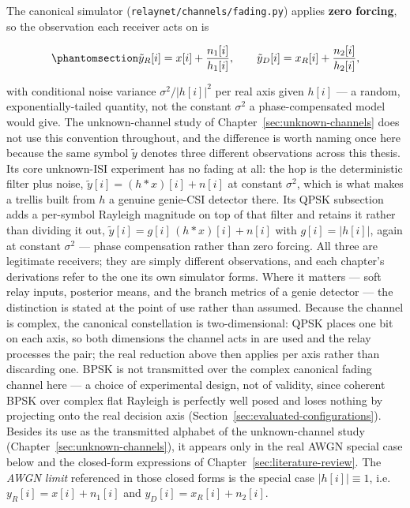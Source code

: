 The canonical simulator (\texttt{relaynet/channels/fading.py}) applies \textbf{zero forcing}, so the observation each receiver acts on is

\begin{equation}\protect\phantomsection\label{eq:awgn-hop1}{\tilde{y}_R[i] = x[i] + \frac{n_1[i]}{h_1[i]}, \qquad \tilde{y}_D[i] = x_R[i] + \frac{n_2[i]}{h_2[i]},
}\end{equation}

with conditional noise variance $\sigma^{2}/|h[i]|^{2}$ per real axis given $h[i]$ --- a random, exponentially-tailed quantity, not the constant $\sigma^{2}$ a phase-compensated model would give. The unknown-channel study of Chapter~\ref{sec:unknown-channels} does not use this convention throughout, and the difference is worth naming once here because the same symbol $\tilde{y}$ denotes three different observations across this thesis. Its core unknown-ISI experiment has no fading at all: the hop is the deterministic filter plus noise, $\tilde{y}[i] = (h \ast x)[i] + n[i]$ at constant $\sigma^{2}$, which is what makes a trellis built from $h$ a genuine genie-CSI detector there. Its QPSK subsection adds a per-symbol Rayleigh magnitude on top of that filter and retains it rather than dividing it out, $\tilde{y}[i] = g[i]\,(h \ast x)[i] + n[i]$ with $g[i] = |h[i]|$, again at constant $\sigma^{2}$ --- phase compensation rather than zero forcing. All three are legitimate receivers; they are simply different observations, and each chapter's derivations refer to the one its own simulator forms. Where it matters --- soft relay inputs, posterior means, and the branch metrics of a genie detector --- the distinction is stated at the point of use rather than assumed. Because the channel is complex, the canonical constellation is two-dimensional: QPSK places one bit on each axis, so both dimensions the channel acts in are used and the relay processes the pair; the real reduction above then applies per axis rather than discarding one. BPSK is not transmitted over the complex canonical fading channel here --- a choice of experimental design, not of validity, since coherent BPSK over complex flat Rayleigh is perfectly well posed and loses nothing by projecting onto the real decision axis (Section~\ref{sec:evaluated-configurations}). Besides its use as the transmitted alphabet of the unknown-channel study (Chapter~\ref{sec:unknown-channels}), it appears only in the real AWGN special case below and the closed-form expressions of Chapter~\ref{sec:literature-review}. The \emph{AWGN limit} referenced in those closed forms is the special case $|h[i]| \equiv 1$, i.e.\ $y_R[i] = x[i] + n_1[i]$ and $y_D[i] = x_R[i] + n_2[i]$.


